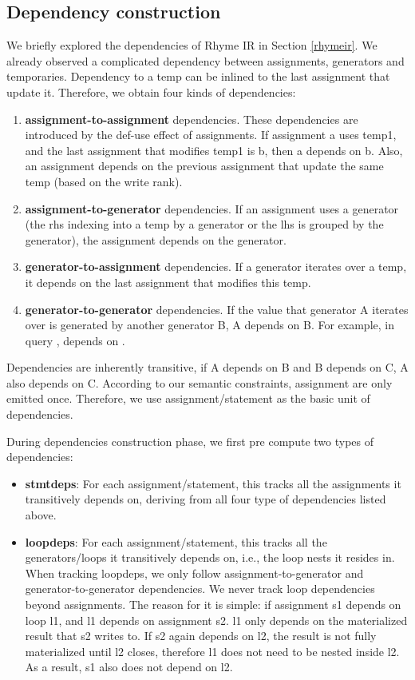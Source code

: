 \documentclass[sigplan, nonacm]{acmart}\settopmatter{printfolios=true,printccs=false,printacmref=false}
\begin{document}
\subsection[]{Dependency construction}\label{depsonstruct}
\iffalse
We briefly explored the dependencies of Rhyme IR in Section \ref{rhymeir}. We already observed a complicated dependency between assignments, generators and temporaries. Dependency to a temp can be inlined to the last assignment that update it. Therefore, we obtain four kinds of dependencies:
\begin{enumerate}
  \item \textbf{assignment-to-assignment} dependencies. These dependencies are introduced by the def-use effect of assignments. If assignment a uses temp1, and the last assignment that modifies temp1 is b, then a depends on b. Also, an assignment depends on the previous assignment that update the same temp (based on the write rank).
  \item \textbf{assignment-to-generator} dependencies. If an assignment uses a generator (the rhs indexing into a temp by a generator or the lhs is grouped by the generator), the assignment depends on the generator.
  \item \textbf{generator-to-assignment} dependencies. If a generator iterates over a temp, it depends on the last assignment that modifies this temp.
  \item \textbf{generator-to-generator} dependencies. If the value that generator A iterates over is generated by another generator B, A depends on B. For example, in query ,  depends on .
\end{enumerate}
Dependencies are inherently transitive, if A depends on B and B depends on C, A also depends on C. According to our semantic constraints, assignment are only emitted once. Therefore, we use assignment/statement as the basic unit of dependencies. \par During dependencies construction phase, we first pre compute two types of dependencies:
\begin{itemize}
  \item \textbf{stmtdeps}: For each assignment/statement, this tracks all the assignments it transitively depends on, deriving from all four type of dependencies listed above.
  \item \textbf{loopdeps}: For each assignment/statement, this tracks all the generators/loops it transitively depends on, i.e., the loop nests it resides in. When tracking loopdeps, we only follow assignment-to-generator and generator-to-generator dependencies. We never track loop dependencies beyond  assignments. The reason for it is simple: if assignment s1 depends on loop l1, and l1 depends on assignment s2. l1 only depends on the materialized result that s2 writes to. If s2 again depends on l2, the result is not fully materialized until l2 closes, therefore l1 does not need to be nested inside l2. As a result, s1 also does not depend on l2.
\end{itemize}
\end{document}
